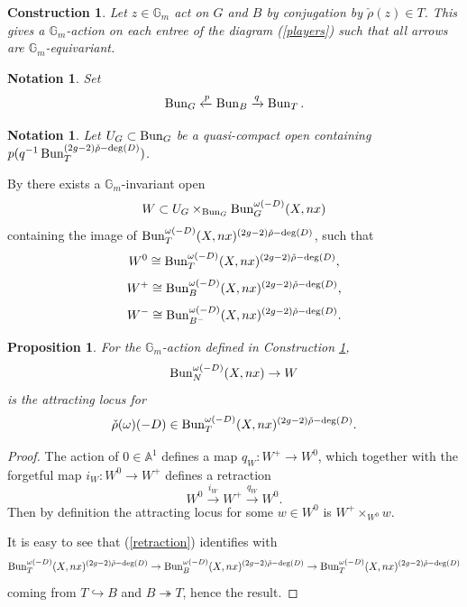 \documentclass[9pt]{amsart}
\newcommand{\bA}{{\mathbb A}}
\newcommand{\bG}{{\mathbb G}}
\newtheorem{pr}[subsubsection]{Proposition}
\newtheorem{cnstr}[subsubsection]{Construction}
\newtheorem{ntn}[subsubsection]{Notation}
\numberwithin{equation}{section}
\begin{document}
\begin{cnstr}\label{action}
	Let $z \in \bG_m$ act on $G$ and $B$ by conjugation by $\check{\rho}(z) \in T$. This gives a $\bG_m$-action on each entree of the diagram (\ref{players}) such that all arrows are $\bG_m$-equivariant.
\end{cnstr}

\begin{ntn}
	Set $$\operatorname{{Bun}}_{G} \xleftarrow{p} \operatorname{{Bun}}_B \xrightarrow{q} \operatorname{{Bun}}_T.$$
\end{ntn}

\begin{ntn}
	Let $U_G \subset \operatorname{{Bun}}_G$ be a quasi-compact open containing $p(q^{-1} \operatorname{{Bun}}_T^{(2g-2)\check{\rho}-\deg(D)})$. 
\end{ntn}

By \cite[4.7.2]{DG} there exists a $\bG_m$-invariant open $$W \subset U_G \times_{\operatorname{{Bun}}_G}  \operatorname{{Bun}}_{G}^{\omega(-D)}(X, nx)$$ containing the image of $\operatorname{{Bun}}_{T}^{\omega(-D)}(X, nx)^{(2g-2)\check{\rho}-\deg(D)}$,  such that 
$$W^0 \cong \operatorname{{Bun}}_{T}^{\omega(-D)}(X, nx)^{(2g-2)\check{\rho}-\deg(D)},$$
$$W^+ \cong \operatorname{{Bun}}_{B}^{\omega(-D)}(X, nx)^{(2g-2)\check{\rho}-\deg(D)},$$
$$W^- \cong \operatorname{{Bun}}_{B^-}^{\omega(-D)}(X, nx)^{(2g-2)\check{\rho}-\deg(D)}.$$

\begin{pr}
	For the $\bG_m$-action defined in Construction \ref{action}, 
	$$\operatorname{{Bun}}_{N}^{\omega(-D)}(X, nx) \rightarrow W$$
	is the attracting locus for $$\check{\rho}(\omega)(-D) \in  \operatorname{{Bun}}_{T}^{\omega(-D)}(X, nx)^{(2g-2)\check{\rho}-\deg(D)}.$$
\end{pr}

\begin{proof}
	The action of $0 \in \bA^1$ defines a map $q_W: W^+ \rightarrow W^0$, which together with the forgetful map $i_W: W^0 \rightarrow W^+$ defines a retraction 
	\begin{equation}\label{retraction}
		W^0 \xrightarrow{i_W} W^+ \xrightarrow{q_W} W^0.
	\end{equation}
	Then by definition the attracting locus for some $w \in W^0$ is $W^+ \times_{W^0} w$.
	
	It is easy to see that (\ref{retraction}) identifies with 
	\begin{equation}
		\operatorname{{Bun}}_{T}^{\omega(-D)}(X, nx)^{(2g-2)\check{\rho}-\deg(D)} \rightarrow \operatorname{{Bun}}_{B}^{\omega(-D)}(X, nx)^{(2g-2)\check{\rho}-\deg(D)} \rightarrow \operatorname{{Bun}}_{T}^{\omega(-D)}(X, nx)^{(2g-2)\check{\rho}-\deg(D)}
	\end{equation}
	coming from $T \hookrightarrow B$ and $B \twoheadrightarrow T$, hence the result. 
\end{proof}
\end{document}
